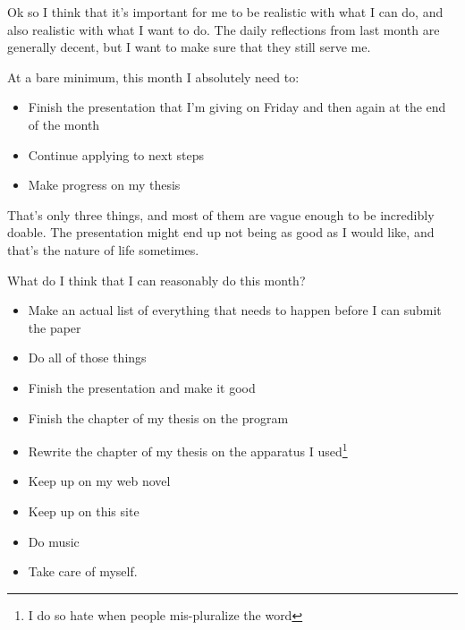 \documentclass[12pt]{article}
\renewcommand{\,}{\textsuperscript{,}}
\begin{document}
Ok so I think that it's important for me to be realistic with what I can do, and also realistic with what I want to do.  
The daily reflections from last month are generally decent, but I want to make sure that they still serve me.

At a bare minimum, this month I absolutely need to:

\begin{itemize}

\item Finish the presentation that I'm giving on Friday and then again at the end of the month

\item Continue applying to next steps

\item Make progress on my thesis

\end{itemize}

That's only three things, and most of them are vague enough to be incredibly doable.  
The presentation might end up not being as good as I would like, and that's the nature of life sometimes.

What do I think that I can reasonably do this month?

\begin{itemize}

\item Make an actual list of everything that needs to happen before I can submit the paper

\item Do all of those things

\item Finish the presentation and make it good

\item Finish the chapter of my thesis on the program

\item Rewrite the chapter of my thesis on the apparatus I used\footnote{I do so hate when people mis-pluralize the word}

\item Keep up on my web novel

\item Keep up on this site

\item Do music

\item Take care of myself.

\end{itemize}
\end{document}
